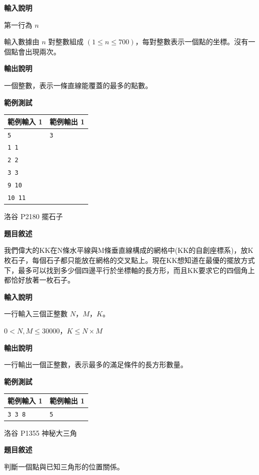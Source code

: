     \textbf{輸入說明}

    第一行為 $n$

    輸入數據由 $n$ 對整數組成 $(1 \le n \le 700)$，每對整數表示一個點的坐標。沒有一個點會出現兩次。

    \textbf{輸出說明}

    一個整數，表示一條直線能覆蓋的最多的點數。

    \textbf{範例測試}

    \begin{tabular}{|m{7cm}|m{7cm}|}
        \hline
        範例輸入 1 & 範例輸出 1 \\
        \hline
        \verb|5| & \verb|3| \\
        \verb|1 1| & \\
        \verb|2 2| & \\
        \verb|3 3| & \\
        \verb|9 10| & \\
        \verb|10 11| & \\
        \hline
    \end{tabular}

    \problem 洛谷 P2180 擺石子

    \textbf{題目敘述}

    我們偉大的KK在N條水平線與M條垂直線構成的網格中(KK的自創座標系)，放K枚石子，每個石子都只能放在網格的交叉點上。現在KK想知道在最優的擺放方式下，最多可以找到多少個四邊平行於坐標軸的長方形，而且KK要求它的四個角上都恰好放著一枚石子。

    \textbf{輸入說明}

    一行輸入三個正整數 $N$，$M$，$K$。

    $0 < N, M \le 30000$，$K \le N \times M$

    \textbf{輸出說明}

    一行輸出一個正整數，表示最多的滿足條件的長方形數量。

    \textbf{範例測試}

    \begin{tabular}{|m{7cm}|m{7cm}|}
        \hline
        範例輸入 1 & 範例輸出 1 \\
        \hline
        \verb|3 3 8| & \verb|5| \\
        \hline
    \end{tabular}

    \problem 洛谷 P1355 神秘大三角

    \textbf{題目敘述}

    判斷一個點與已知三角形的位置關係。

